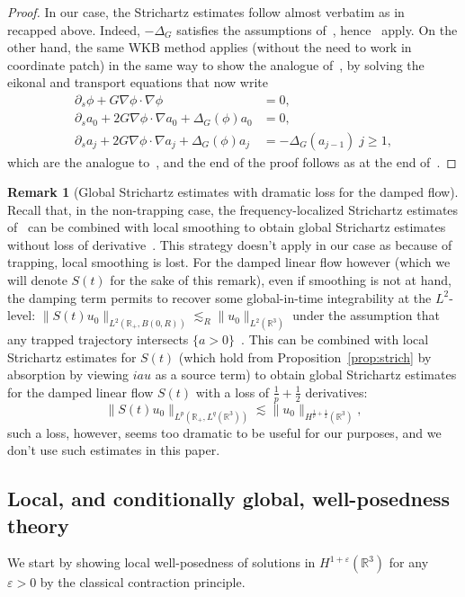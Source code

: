 \documentclass[10pt]{amsart}
\theoremstyle{definition}\newtheorem{defi}[theo]{Definition}\newtheorem{rema}[theo]{Remark}\newtheorem{exam}[theo]{Example}\newtheorem{exem}[theo]{Example}\newtheorem{nota}[theo]{Notation}
\newcommand*\R{\mathbb{R}}
\newcommand*\eps{\varepsilon}
\begin{document}
\begin{proof}
In our case, the Strichartz estimates follow almost verbatim as in~\cite[Appendix~A.1]{BuGeTz04} recapped above. Indeed, $-\Delta_G$ satisfies the assumptions of~\cite[Proposition~A.1]{BuGeTz04}, hence~\cite[Proposition~A.1, Corollary~A.2]{BuGeTz04} apply. On the other hand, the same WKB method applies (without the need to work in coordinate patch) in the same way to show the analogue of~\cite[Lemma~2.5]{BuGeTz04}, by solving the eikonal and transport equations that now write
\begin{align*}
\partial_s \phi + G\nabla \phi \cdot \nabla \phi &= 0,
\\
\partial_s a_0 + 2 G \nabla \phi \cdot \nabla a_0 + \Delta_G (\phi) a_0 &= 0,
\\
\partial_s a_j+ 2 G \nabla \phi \cdot \nabla a_j + \Delta_G (\phi) a_j &= - \Delta_G (a_{j-1})\; j\geq 1,
\end{align*}
which are the analogue to~\cite[(2.19)--(2.20)--(2.21)]{BuGeTz04}, and the end of the proof follows as at the end of~\cite[Appendix~A.1]{BuGeTz04}.
\end{proof}

\begin{rema}[{Global Strichartz estimates with dramatic loss for the damped flow}]\label{rk:dram}
Recall that, in the non-trapping case, the frequency-localized Strichartz estimates of~\cite{BuGeTz04} can be combined with local smoothing to obtain global Strichartz estimates without loss of derivative~\cite{Iv10, StTa02}. This strategy doesn't apply in our case as because of trapping, local smoothing is lost. For the damped linear flow however (which we will denote $S(t)$ for the sake of this remark), even if smoothing is not at hand, the damping term permits to recover some global-in-time integrability at the $L^2$-level: $\| S(t) u_0 \|_{L^2(\R_+, B(0, R))} \lesssim_R \| u_0 \|_{L^2(\R^3)}$ under the assumption that any trapped trajectory intersects $\{ a > 0 \}$~\cite{AlKh07}. This can be combined with local Strichartz estimates for $S(t)$ (which hold from Proposition~\ref{prop:strich} by absorption by viewing $iau$ as a source term) to obtain global Strichartz estimates for the damped linear flow $S(t)$ with a loss of $\frac 1p + \frac 12$ derivatives:
\[
\| S(t) u_0 \|_{L^p\left(\R_+, L^q(\R^3)\right)} \lesssim \| u_0 \|_{H^{\frac 1p + \frac 12}(\R ^3)},
\]
such a loss, however, seems too dramatic to be useful for our purposes, and we don't use such estimates in this paper.
\end{rema}
\subsection{Local, and conditionally global, well-posedness theory} We start by showing local well-posedness of solutions in $H^{1+\eps}(\R^3)$ for any $\eps >0$ by the classical contraction principle.
\end{document}
